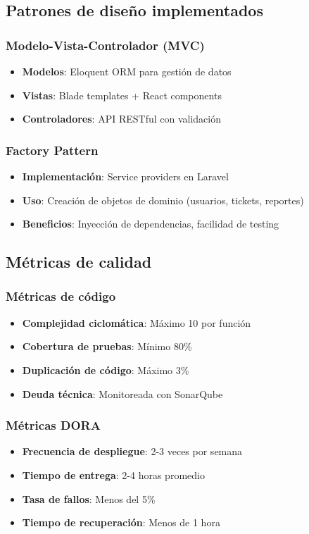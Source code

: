 \subsection{Patrones de diseño implementados}

\subsubsection{Modelo-Vista-Controlador (MVC)}
\begin{itemize}[leftmargin=*]
  \item \textbf{Modelos}: Eloquent ORM para gestión de datos
  \item \textbf{Vistas}: Blade templates + React components
  \item \textbf{Controladores}: API RESTful con validación
\end{itemize}

\subsubsection{Factory Pattern}
\begin{itemize}[leftmargin=*]
  \item \textbf{Implementación}: Service providers en Laravel
  \item \textbf{Uso}: Creación de objetos de dominio (usuarios, tickets, reportes)
  \item \textbf{Beneficios}: Inyección de dependencias, facilidad de testing
\end{itemize}

\subsection{Métricas de calidad}

\subsubsection{Métricas de código}
\begin{itemize}[leftmargin=*]
  \item \textbf{Complejidad ciclomática}: Máximo 10 por función
  \item \textbf{Cobertura de pruebas}: Mínimo 80\%
  \item \textbf{Duplicación de código}: Máximo 3\%
  \item \textbf{Deuda técnica}: Monitoreada con SonarQube
\end{itemize}

\subsubsection{Métricas DORA}
\begin{itemize}[leftmargin=*]
  \item \textbf{Frecuencia de despliegue}: 2-3 veces por semana
  \item \textbf{Tiempo de entrega}: 2-4 horas promedio
  \item \textbf{Tasa de fallos}: Menos del 5\%
  \item \textbf{Tiempo de recuperación}: Menos de 1 hora
\end{itemize}

